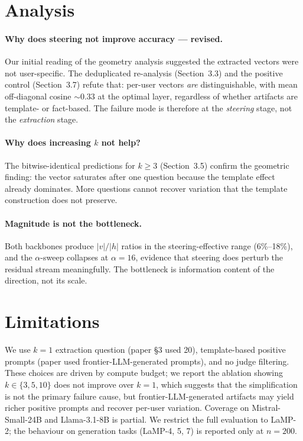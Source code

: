 \documentclass[10pt]{article}
\begin{document}
\section{Analysis}
\paragraph{Why does steering not improve accuracy --- revised.}
Our initial reading of the geometry analysis suggested the extracted
vectors were not user-specific.  The deduplicated re-analysis
(Section~3.3) and the positive control (Section~3.7) refute that:
per-user vectors \emph{are} distinguishable, with mean off-diagonal cosine
$\sim\!0.33$ at the optimal layer, regardless of whether artifacts are
template- or fact-based.  The failure mode is therefore at the
\emph{steering} stage, not the \emph{extraction} stage.

\paragraph{Why does increasing $k$ not help?}
The bitwise-identical predictions for $k{\ge}3$ (Section~3.5) confirm the
geometric finding: the vector saturates after one question because the
template effect already dominates.  More questions cannot recover variation
that the template construction does not preserve.

\paragraph{Magnitude is not the bottleneck.}
Both backbones produce $|v|/|h|$ ratios in the steering-effective range
(6\%–18\%), and the $\alpha$-sweep collapses at $\alpha{=}16$, evidence
that steering does perturb the residual stream meaningfully.  The bottleneck
is information content of the direction, not its scale.

\section{Limitations}
We use $k{=}1$ extraction question (paper §3 used 20), template-based
positive prompts (paper used frontier-LLM-generated prompts), and no judge
filtering.  These choices are driven by compute budget; we report the
ablation showing $k\!\in\!\{3,5,10\}$ does not improve over $k{=}1$, which
suggests that the simplification is not the primary failure cause, but
frontier-LLM-generated artifacts may yield richer positive prompts and
recover per-user variation.  Coverage on Mistral-Small-24B and Llama-3.1-8B
is partial.  We restrict the full evaluation to LaMP-2; the behaviour on
generation tasks (LaMP-4, 5, 7) is reported only at $n{=}200$.
\end{document}
